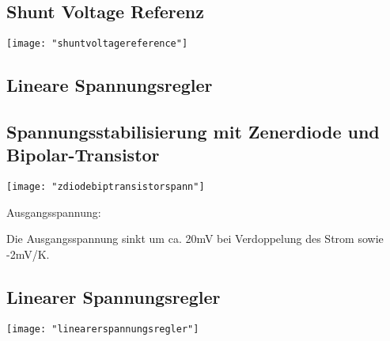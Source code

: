 \subsection{Shunt Voltage Referenz}
\begin{minipage}[t]{0.3\textwidth}
	\vspace{0pt}								%
	\texttt{[image: "shuntvoltagereference"]}
\end{minipage}\hspace{0.05\textwidth}
\begin{minipage}[t]{0.65\textwidth}
	\vspace{0pt}								%
	
\end{minipage}
\vspace{2mm}


\subsection{Lineare Spannungsregler}
\subsection{Spannungsstabilisierung mit Zenerdiode und Bipolar-Transistor}
\begin{minipage}[t]{0.3\textwidth}
	\vspace{0pt}								%
	\texttt{[image: "zdiodebiptransistorspann"]}
\end{minipage}\hspace{0.05\textwidth}
\begin{minipage}[t]{0.65\textwidth}
	\vspace{0pt}								%
	Ausgangsspannung: 
	
	Die Ausgangsspannung sinkt um ca. 20mV bei Verdoppelung des Strom sowie -2mV/K.
	
\end{minipage}
\vspace{2mm}


\subsection{Linearer Spannungsregler}
\begin{minipage}[t]{0.3\textwidth}
	\vspace{0pt}								%
	\texttt{[image: "linearerspannungsregler"]}
\end{minipage}\hspace{0.05\textwidth}
\begin{minipage}[t]{0.65\textwidth}
	\vspace{0pt}								%
\end{minipage}
\vspace{2mm}


